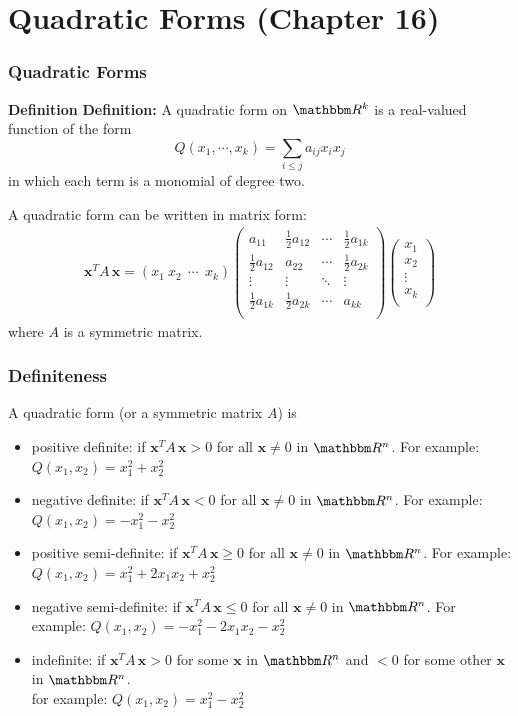 \documentclass[9pt,aspectratio=169]{beamer}
\newcommand{\RR}{\mathbbm R}
\begin{document}
\section{Quadratic Forms (Chapter 16)}
\begin{frame}
	\frametitle{Quadratic Forms}
    \begin{block}{\bfseries Definition}
        \textbf{Definition:} A quadratic form on $\RR^k$ is a
        real-valued function of the form
        $$Q(x_1,\cdots,x_k) = \sum_{i\leq j}a_{ij}x_ix_j$$
        in which each term is a monomial of degree two.
    \end{block}
    A quadratic form can be written in matrix form:
    \begin{align}
        \mathbf{x}^T\! A\, \mathbf{x} = (x_1\ x_2\ \ \cdots\ \
        x_k)\left({\begin{array}{cccc}
                  a_{11} & \frac{1}{2}a_{12} & \cdots & \frac{1}{2}a_{1k}\\
                  \frac{1}{2}a_{12} & a_{22} & \cdots & \frac{1}{2}a_{2k}\\
                  \vdots & \vdots & \ddots & \vdots \\
                  \frac{1}{2}a_{1k} & \frac{1}{2}a_{2k} & \cdots & a_{kk}\\
              \end{array}}\right)\left({\begin{array}{c}
                  x_1 \\
                  x_2 \\
                  \vdots \\
                  x_k \\
              \end{array}}\right) \nonumber
    \end{align}
    where $A$ is a symmetric matrix.
\end{frame}


\begin{frame}
	\frametitle{Definiteness}
    A quadratic form (or a symmetric matrix $A$) is
	\begin{itemize}
		\item positive definite: if $\mathbf{x}^T\!A\,\mathbf{x}>0$ for all $\mathbf{x}\neq0$ in $\RR^n$. For example: $Q(x_1,x_2) = x_1^2+x_2^2$
		 \item negative definite: if $\mathbf{x}^T\!A\,\mathbf{x}<0$ for all $\mathbf{x}\neq0$ in $\RR^n$. For example: $Q(x_1,x_2) = -x_1^2-x_2^2$
		 \item positive semi-definite: if $\mathbf{x}^T\!A\,\mathbf{x}\geq0$ for all $\mathbf{x}\neq0$ in $\RR^n$. For example: $Q(x_1,x_2) = x_1^2+2x_1x_2+x_2^2$
		 \item negative semi-definite: if $\mathbf{x}^T\!A\,\mathbf{x}\leq0$ for all $\mathbf{x}\neq0$ in $\RR^n$. For example: $Q(x_1,x_2) = -x_1^2-2x_1x_2-x_2^2$
		 \item indefinite: if  $\mathbf{x}^T\!A\,\mathbf{x} > 0$ for some $\mathbf{x} $ in $\RR^n$ and $< 0$ for some other $\mathbf{x}$ in $\RR^n$. \\
		 for example: $Q(x_1,x_2) = x_1^2-x_2^2$
	\end{itemize}
\end{frame}
\end{document}
